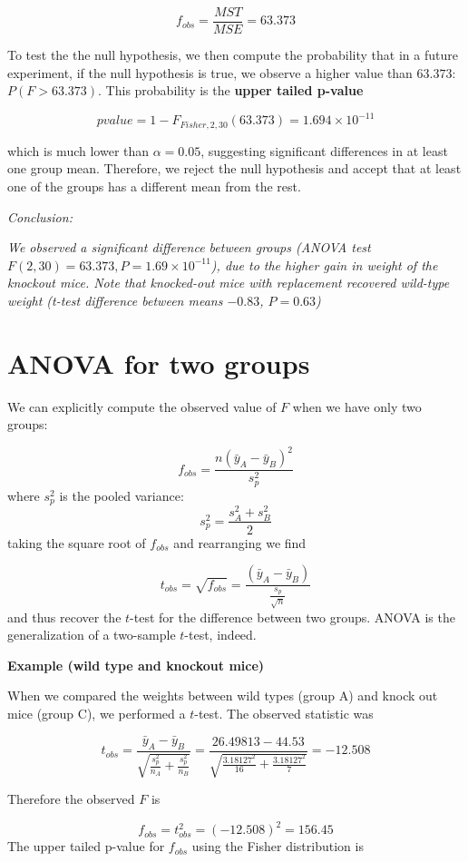 \documentclass[
]{book}
\begin{document}
\[f_{obs}=\frac{MST}{MSE}=63.373\]

To test the the null hypothesis, we then compute the probability that in a future experiment, if the null hypothesis is true, we observe a higher value than \(63.373\): \(P(F>63.373)\). This probability is the \textbf{upper tailed p-value}

\[pvalue=1-F_{Fisher,2,30}(63.373)=1.694 \times 10^{-11}\]

which is much lower than \(\alpha=0.05\), suggesting significant differences in at least one group mean. Therefore, we reject the null hypothesis and accept that at least one of the groups has a different mean from the rest.

\emph{Conclusion:}

\emph{We observed a significant difference between groups (ANOVA test \(F(2,30)=63.373, P= 1.69 \times 10^{-11}\)), due to the higher gain in weight of the knockout mice. Note that knocked-out mice with replacement recovered wild-type weight (t-test difference between means \(-0.83\), \(P=0.63\))}

\hypertarget{anova-for-two-groups}{%
\section{ANOVA for two groups}\label{anova-for-two-groups}}

We can explicitly compute the observed value of \(F\) when we have only two groups:

\[f_{obs}=\frac{n(\bar{y}_{A}-\bar{y}_{B})^2}{s^2_p}\]
where \(s^2_p\) is the pooled variance:
\[s^2_p= \frac{s_A^2 + s_B^2}{{2}}\]
taking the square root of \(f_{obs}\) and rearranging we find

\[t_{obs}=\sqrt{f_{obs}}=\frac{(\bar{y}_{A}-\bar{y}_{B})}{\frac{s_p}{\sqrt{n}}}\]
and thus recover the \(t\)-test for the difference between two groups. ANOVA is the generalization of a two-sample \(t\)-test, indeed.

\textbf{Example (wild type and knockout mice)}

When we compared the weights between wild types (group A) and knock out mice (group C), we performed a \(t\)-test. The observed statistic was

\[t_{obs}=\frac{\bar{y}_A-\bar{y}_B }{\sqrt{\frac{s^2_p}{n_A}+\frac{s^2_p}{n_B}}}=\frac{26.49813-44.53}{\sqrt{\frac{3.18127^2}{16}+\frac{3.18127^2}{7}}}=-12.508\]

Therefore the observed \(F\) is

\[f_{obs}=t_{obs}^2=(−12.508)^2=156.45\]
The upper tailed p-value for \(f_{obs}\) using the Fisher distribution is
\end{document}
